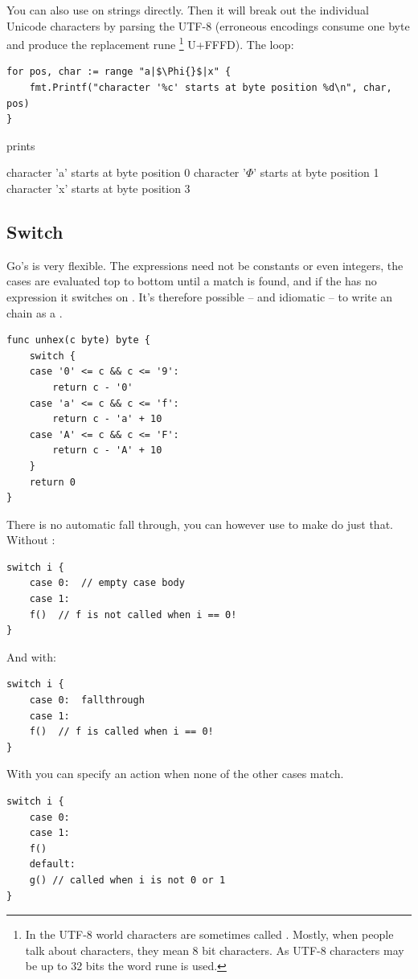 You can also use  on strings directly. Then it
will break out the individual Unicode characters by parsing the UTF-8 (erroneous encodings consume one
byte and produce the replacement rune \footnote{In the UTF-8 world characters are
sometimes called . Mostly, when people talk about
characters, they mean 8 bit characters. As UTF-8 characters may be up to 32 bits the word
rune is used.} U+FFFD). The loop: 
\begin{lstlisting}
for pos, char := range "a|$\Phi{}$|x" {
    fmt.Printf("character '%c' starts at byte position %d\n", char, pos)
}
\end{lstlisting}
prints
\begin{display}
character 'a' starts at byte position 0
character '\begin{math}\Phi\end{math}' starts at byte position 1
character 'x' starts at byte position 3
\end{display}

\subsection{Switch}
Go's  is very flexible. The expressions need
not be
constants or even integers, the cases are evaluated top to bottom until
a match is found, and if the  has no expression it switches on
. It's therefore possible -- and idiomatic -- to write an
 chain as a .
\begin{lstlisting}
func unhex(c byte) byte {
    switch {
    case '0' <= c && c <= '9':
        return c - '0'
    case 'a' <= c && c <= 'f':
        return c - 'a' + 10
    case 'A' <= c && c <= 'F':
        return c - 'A' + 10
    }
    return 0
}
\end{lstlisting}
There is no automatic fall through, you can however use
 to make do just that.
Without :
\begin{lstlisting}
switch i {
    case 0:  // empty case body
    case 1:
	f()  // f is not called when i == 0!
}
\end{lstlisting}
And with:
\begin{lstlisting}
switch i {
    case 0:  fallthrough
    case 1:
	f()  // f is called when i == 0!
}
\end{lstlisting}
With  you can specify an action
when none of the other cases match.
\begin{lstlisting}
switch i {
    case 0:  
    case 1:
	f()
    default:	
	g()	// called when i is not 0 or 1
}
\end{lstlisting}

